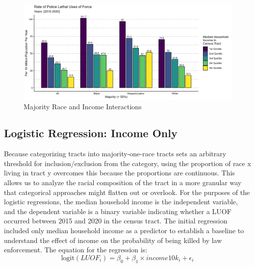 \documentclass[12pt]{article}
\begin{document}
\begin{figure}[H]
  \centering %
  \includegraphics[width=\linewidth]{images/race_only_denom_race}
  \captionsetup{justification=centering, singlelinecheck=false, margin=2cm}
  \caption[Majority Race and Income Interactions]{Majority Race and Income Interactions}
  \label{fig:majority_income_interactions}
\end{figure}


\subsection{Logistic Regression: Income Only}

Because categorizing tracts into majority-one-race tracts sets an arbitrary threshold for inclusion/exclusion from the category, using the proportion of race x living in tract y overcomes this because the proportions are continuous. This allows us to analyze the racial composition of the tract in a more granular way that categorical approaches might flatten out or overlook. For the purposes of the logistic regressions, the median household income is the independent variable, and the dependent variable is a binary variable indicating whether a LUOF occurred between 2015 and 2020 in the census tract. The initial regression included only median household income as a predictor to establish a baseline to understand the effect of income on the probability of being killed by law enforcement. The equation for the regression is:
\begin{equation}
\text{logit}(LUOF_{i})=\beta_{0} + \beta_{1} \times income10k_{i} + \epsilon_{i}
\end{equation}
\end{document}
